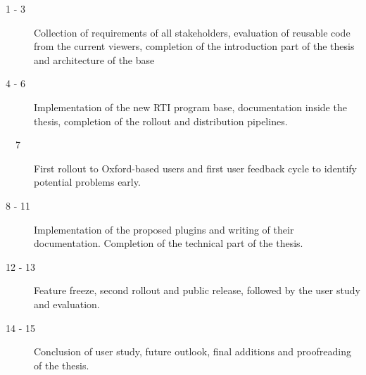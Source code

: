 \documentclass{article}
\begin{document}
\begin{description}
\item[1 - 3] Collection of requirements of all stakeholders, evaluation of
  reusable code from the current viewers, completion of the introduction
  part of the thesis and architecture of the base
\item[4 - 6] Implementation of the new RTI program base, documentation inside
  the thesis, completion of the rollout and distribution pipelines.
\item[\ \ 7 \ \ ] First rollout to Oxford-based users and first user feedback cycle to
  identify potential problems early.
\item[8 - 11] Implementation of the proposed plugins and writing of their
  documentation. Completion of the technical part of the thesis.
\item[12 - 13] Feature freeze, second rollout and public release, followed by
  the user study and evaluation.
\item[14 - 15] Conclusion of user study, future outlook, final additions and proofreading of the thesis.
\end{description}

\printbibliography
\end{document}
